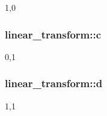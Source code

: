 1,0 \hypertarget{structlinear__transform_3aa106a626742aab0ff34ba42b2405f5}{
\subsubsection{ {\bf linear\_\-transform::c}}}
\label{structlinear__transform_3aa106a626742aab0ff34ba42b2405f5}


0,1 \hypertarget{structlinear__transform_8dacf30dd4e0fe5f190e538393b22295}{
\subsubsection{ {\bf linear\_\-transform::d}}}
\label{structlinear__transform_8dacf30dd4e0fe5f190e538393b22295}


1,1 